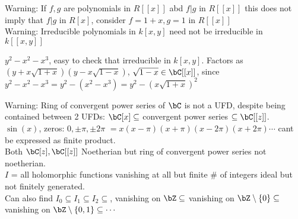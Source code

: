 \noindent
Warning: If $f,g$ are polynomials in $R[[x]]$ abd $f|g$ in $R[[x]]$ this does not imply that $f|g$ in $R[x]$, consider $f = 1+x, g=1$ in $R[[x]]$ \\

\noindent
Warning: Irreducible polynomials in $k[x,y]$ need not be irreducible in $k[[x,y]]$ 

\begin{example}
    $y^2-x^2-x^3$, easy to check that irreducible in $k[x,y]$. Factors as $(y + x\sqrt{1+x})(y - x \sqrt{1-x})$, $\sqrt{1-x} \in \bC[[x]]$, since $y^2 - x^2 - x^3 = y^2 - (x^2 - x^3) = y^2 - (x\sqrt{1+x})^2$ 
\end{example}

\noindent
Warning: Ring of convergent power series of $\bC$ is not a UFD, despite being contained between 2 UFDs: $\bC[x] \subseteq$ convergent power series $\subseteq \bC[[z]]$. \\
$\sin(x)$, zeros: $0, \pm \pi, \pm 2 \pi$ $ = x(x-\pi)(x + \pi)(x - 2\pi)(x + 2 \pi) \cdots$ cant be expressed as finite product. \\
Both $\bC[z], \bC[[z]]$ Noetherian but ring of convergent power series not noetherian. \\ 
$I$ = all holomorphic functions vanishing at all but finite $\#$ of integers ideal but not finitely generated. \\
Can also find $I_0 \subseteq I_1 \subseteq I_2 \subseteq $,  vanishing on $\bZ \subseteq $ vanishing on $\bZ \setminus \{0\} \subseteq$ vanishing on $\bZ \setminus \{0,1\} \subseteq \cdots$  